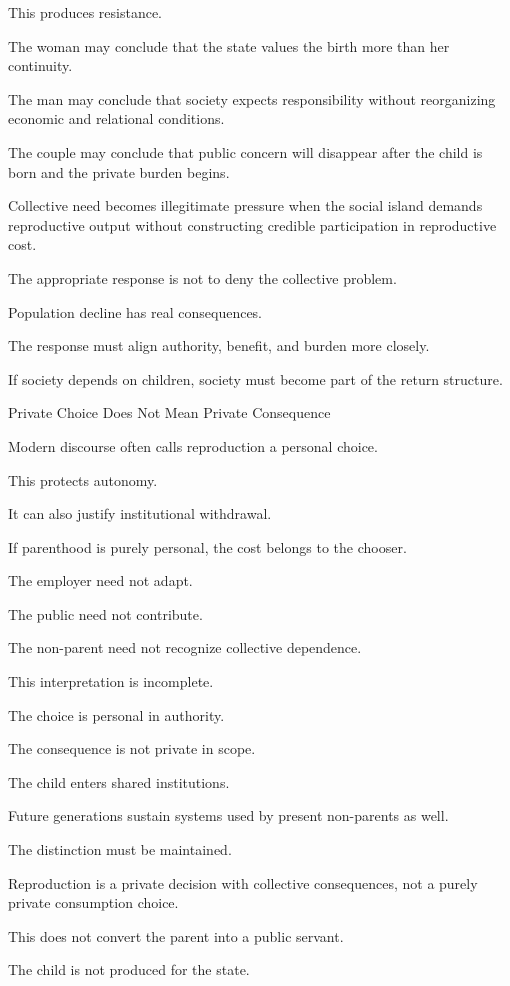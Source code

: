 This produces resistance.

The woman may conclude that the state values the birth more than her continuity.

The man may conclude that society expects responsibility without reorganizing economic and relational conditions.

The couple may conclude that public concern will disappear after the child is born and the private burden begins.

Collective need becomes illegitimate pressure when the social island demands reproductive output without constructing credible participation in reproductive cost.

The appropriate response is not to deny the collective problem.

Population decline has real consequences.

The response must align authority, benefit, and burden more closely.

If society depends on children, society must become part of the return structure.

Private Choice Does Not Mean Private Consequence

Modern discourse often calls reproduction a personal choice.

This protects autonomy.

It can also justify institutional withdrawal.

If parenthood is purely personal, the cost belongs to the chooser.

The employer need not adapt.

The public need not contribute.

The non-parent need not recognize collective dependence.

This interpretation is incomplete.

The choice is personal in authority.

The consequence is not private in scope.

The child enters shared institutions.

Future generations sustain systems used by present non-parents as well.

The distinction must be maintained.

Reproduction is a private decision with collective consequences, not a purely private consumption choice.

This does not convert the parent into a public servant.

The child is not produced for the state.

